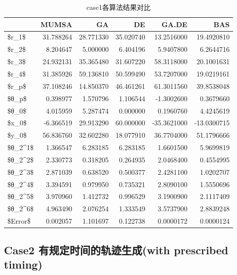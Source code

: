 \documentclass[]{ctexbook}
\theoremstyle{definition}
\theoremstyle{definition}
\theoremstyle{definition}
\theoremstyle{remark}
\begin{document}
\begin{table}

\caption{\label{tab:case1table}case1各算法结果对比}
\centering
\begin{tabular}[t]{lrrrrr}
\toprule
  & MUMSA & GA & DE & GA.DE & BAS\\
\midrule
\$r\_1\$ & 31.788264 & 28.771330 & 35.020740 & 13.2516000 & 19.4920810\\
\$r\_2\$ & 8.204647 & 5.000000 & 6.404196 & 5.9407800 & 6.2644716\\
\$r\_3\$ & 24.932131 & 35.365480 & 31.607220 & 58.3118000 & 20.1001631\\
\$r\_4\$ & 31.385926 & 59.136810 & 50.599490 & 53.7207000 & 19.0219161\\
\$r\_p\$ & 37.108246 & 14.850370 & 46.461261 & 61.3011560 & 39.8538048\\
\addlinespace
\$θ\_p\$ & 0.398977 & 1.570796 & 1.106544 & -1.3002600 & 0.3679660\\
\$θ\_0\$ & 4.015959 & 5.287474 & 0.000000 & 0.1960760 & 4.4245619\\
\$x\_0\$ & -6.366519 & 29.913290 & 60.000000 & -35.3621000 & -13.0300715\\
\$y\_0\$ & 56.836760 & 32.602280 & 18.077910 & 36.7704000 & 51.1796666\\
\$θ\_2\textasciicircum{}1\$ & 1.366547 & 6.283185 & 6.283185 & 1.6601500 & 5.9699819\\
\addlinespace
\$θ\_2\textasciicircum{}2\$ & 2.330773 & 0.318205 & 0.264935 & 2.0468400 & 0.4554995\\
\$θ\_2\textasciicircum{}3\$ & 2.871039 & 0.638520 & 0.500377 & 2.4281100 & 1.0202707\\
\$θ\_2\textasciicircum{}4\$ & 3.394591 & 0.979950 & 0.735321 & 2.8090100 & 1.5550696\\
\$θ\_2\textasciicircum{}5\$ & 3.970960 & 1.412732 & 0.996529 & 3.1900900 & 2.1117409\\
\$θ\_2\textasciicircum{}6\$ & 4.963490 & 2.076254 & 1.333549 & 3.5737900 & 2.8839248\\
\$Error\$ & 0.002057 & 1.101697 & 0.122738 & 0.0000172 & 0.0000124\\
\bottomrule
\end{tabular}
\end{table}

\subsection{Case2 有规定时间的轨迹生成(with prescribed
timing)}\label{case2-with-prescribed-timing}
\end{document}

